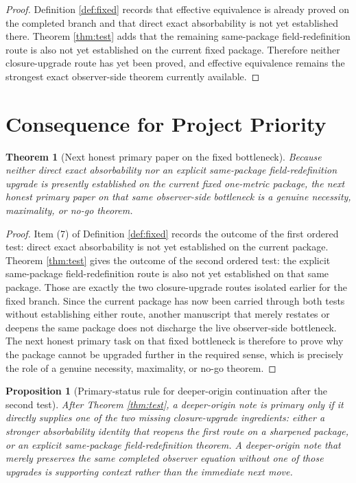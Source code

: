 \documentclass[11pt]{article}
\newtheorem{proposition}{Proposition}
\newtheorem{theorem}{Theorem}
\begin{document}
\begin{proof}
Definition \ref{def:fixed} records that effective equivalence is already proved on the completed branch and that direct exact absorbability is not yet established there. Theorem \ref{thm:test} adds that the remaining same-package field-redefinition route is also not yet established on the current fixed package. Therefore neither closure-upgrade route has yet been proved, and effective equivalence remains the strongest exact observer-side theorem currently available.
\end{proof}

\section{Consequence for Project Priority}

\begin{theorem}[Next honest primary paper on the fixed bottleneck]
\label{thm:next}
Because neither direct exact absorbability nor an explicit same-package field-redefinition upgrade is presently established on the current fixed one-metric package, the next honest primary paper on that same observer-side bottleneck is a genuine necessity, maximality, or no-go theorem.
\end{theorem}

\begin{proof}
Item (7) of Definition \ref{def:fixed} records the outcome of the first ordered test: direct exact absorbability is not yet established on the current package. Theorem \ref{thm:test} gives the outcome of the second ordered test: the explicit same-package field-redefinition route is also not yet established on that same package. Those are exactly the two closure-upgrade routes isolated earlier for the fixed branch. Since the current package has now been carried through both tests without establishing either route, another manuscript that merely restates or deepens the same package does not discharge the live observer-side bottleneck. The next honest primary task on that fixed bottleneck is therefore to prove why the package cannot be upgraded further in the required sense, which is precisely the role of a genuine necessity, maximality, or no-go theorem.
\end{proof}

\begin{proposition}[Primary-status rule for deeper-origin continuation after the second test]
\label{prop:depth}
After Theorem \ref{thm:test}, a deeper-origin note is primary only if it directly supplies one of the two missing closure-upgrade ingredients: either a stronger absorbability identity that reopens the first route on a sharpened package, or an explicit same-package field-redefinition theorem. A deeper-origin note that merely preserves the same completed observer equation without one of those upgrades is supporting context rather than the immediate next move.
\end{proposition}
\end{document}
